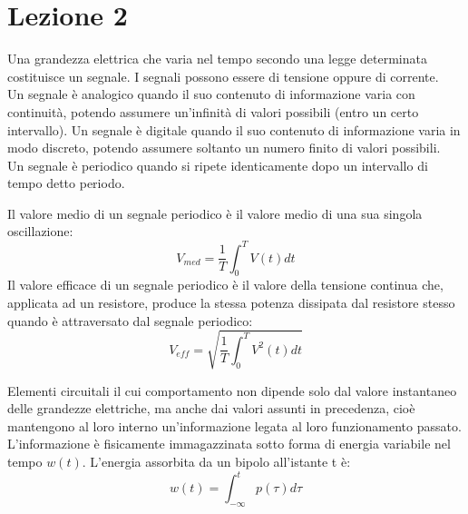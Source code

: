 \section{Lezione 2}

\begin{defn}[Segnale]
    Una grandezza elettrica che varia nel tempo secondo una legge determinata costituisce un segnale. 
    I segnali possono essere di tensione oppure di corrente. \\
    Un segnale è analogico quando il suo contenuto di informazione varia con
    continuità, potendo assumere un'infinità di valori possibili (entro un certo intervallo).
    Un segnale è digitale quando il suo contenuto di informazione varia in modo discreto, 
    potendo assumere soltanto un numero finito di valori possibili. \\
    Un segnale è periodico quando si ripete identicamente dopo un intervallo di tempo detto periodo.
\end{defn}

\begin{defn}
    Il valore medio di un segnale periodico è il valore medio di una sua singola oscillazione: 
    $$V_{med} = \frac{1}{T} \int_{0}^{T} V(t) dt$$
    Il valore efficace di un segnale periodico è il valore della tensione continua che, applicata ad un resistore, 
    produce la stessa potenza dissipata dal resistore stesso quando è attraversato dal segnale periodico: 
    $$V_{eff} = \sqrt{\frac{1}{T} \int_{0}^{T} V^2(t) dt}$$
\end{defn}

\begin{defn}
    Elementi circuitali il cui comportamento non dipende solo dal valore instantaneo delle grandezze elettriche, 
    ma anche dai valori assunti in precedenza, cioè mantengono al loro interno un'informazione legata al loro funzionamento passato.
    L'informazione è fisicamente immagazzinata sotto forma di energia variabile nel tempo $w(t)$. 
    L'energia assorbita da un bipolo all'istante t è: $$w(t) = \int_{-\infty}^{t} p(\tau) d\tau$$
\end{defn}

